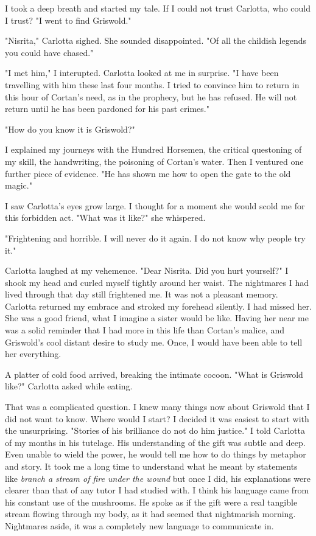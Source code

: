 \documentclass{article}
\begin{document}
I took a deep breath and started my tale. If I could not trust Carlotta, who could I trust? "I went to find Griswold."

"Nisrita," Carlotta sighed. She sounded disappointed. "Of all the childish legends you could have chased."

"I met him," I interupted. Carlotta looked at me in surprise. "I have been travelling with him these last four months. I tried to convince him to return in this hour of Cortan's need, as in the prophecy, but he has refused. He will not return until he has been pardoned for his past crimes."

"How do you know it is Griswold?"

I explained my journeys with the Hundred Horsemen, the critical questoning of my skill, the handwriting, the poisoning of Cortan's water. Then I ventured one further piece of evidence. "He has shown me how to open the gate to the old magic."

I saw Carlotta's eyes grow large. I thought for a moment she would scold me for this forbidden act. "What was it like?" she whispered.

"Frightening and horrible. I will never do it again. I do not know why people try it."

Carlotta laughed at my vehemence. "Dear Nisrita. Did you hurt yourself?" I shook my head and curled myself tightly around her waist. The nightmares I had lived through that day still frightened me. It was not a pleasant memory. Carlotta returned my embrace and stroked my forehead silently. I had missed her. She was a good friend, what I imagine a sister would be like. Having her near me was a solid reminder that I had more in this life than Cortan's malice, and Griswold's cool distant desire to study me. Once, I would have been able to tell her everything. 

A platter of cold food arrived, breaking the intimate cocoon. "What is Griswold like?" Carlotta asked while eating.

That was a complicated question. I knew many things now about Griswold that I did not want to know. Where would I start? I decided it was easiest to start with the unsurprising. "Stories of his brilliance do not do him justice." I told Carlotta of my months in his tutelage. His understanding of the gift was subtle and deep. Even unable to wield the power, he would tell me how to do things by metaphor and story. It took me a long time to understand what he meant by statements like \emph{branch a stream of fire under the wound} but once I did, his explanations were clearer than that of any tutor I had studied with. I think his language came from his constant use of the mushrooms. He spoke as if the gift were a real tangible stream flowing through my body, as it had seemed that nightmarish morning. Nightmares aside, it was a completely new language to communicate in.
\end{document}
